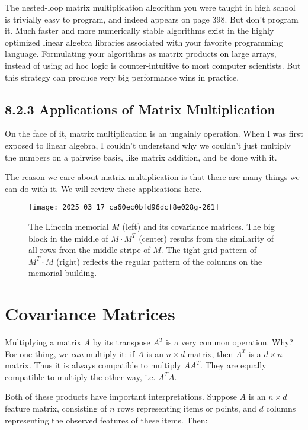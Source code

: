 \documentclass[10pt]{article}
\begin{document}
The nested-loop matrix multiplication algorithm you were taught in high school is trivially easy to program, and indeed appears on page 398. But don't program it. Much faster and more numerically stable algorithms exist in the highly optimized linear algebra libraries associated with your favorite programming language. Formulating your algorithms as matrix products on large arrays, instead of using ad hoc logic is counter-intuitive to most computer scientists. But this strategy can produce very big performance wins in practice.

\subsection*{8.2.3 Applications of Matrix Multiplication}
On the face of it, matrix multiplication is an ungainly operation. When I was first exposed to linear algebra, I couldn't understand why we couldn't just multiply the numbers on a pairwise basis, like matrix addition, and be done with it.

The reason we care about matrix multiplication is that there are many things we can do with it. We will review these applications here.

\begin{figure}[ht]
    \centering
    \texttt{[image: 2025\_03\_17\_ca60ec0bfd96dcf8e028g-261]}
    \caption{The Lincoln memorial $M$ (left) and its covariance matrices. The big block in the middle of $M \cdot M^T$ (center) results from the similarity of all rows from the middle stripe of $M$. The tight grid pattern of $M^T \cdot M$ (right) reflects the regular pattern of the columns on the memorial building.}
    \label{fig:cov_matrices}
\end{figure}

\section*{Covariance Matrices}
Multiplying a matrix $A$ by its transpose $A^T$ is a very common operation. Why? For one thing, we \textit{can} multiply it: if $A$ is an $n \times d$ matrix, then $A^T$ is a $d \times n$ matrix. Thus it is always compatible to multiply $AA^T$. They are equally compatible to multiply the other way, i.e. $A^TA$.

Both of these products have important interpretations. Suppose $A$ is an $n \times d$ feature matrix, consisting of $n$ rows representing items or points, and $d$ columns representing the observed features of these items. Then:
\end{document}

